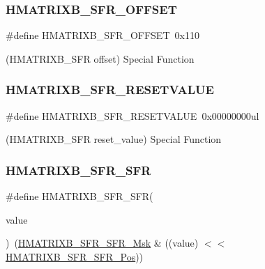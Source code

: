 \subsubsection{\texorpdfstring{HMATRIXB\_SFR\_OFFSET}{HMATRIXB\_SFR\_OFFSET}}
{\footnotesize\ttfamily \#define H\+M\+A\+T\+R\+I\+X\+B\+\_\+\+S\+F\+R\+\_\+\+O\+F\+F\+S\+ET~0x110}



(H\+M\+A\+T\+R\+I\+X\+B\+\_\+\+S\+FR offset) Special Function 

\mbox{\label{group___s_a_m_d21___h_m_a_t_r_i_x_b_ga95ba9b5ac1ee7150547d552e80d562cd}} 
\subsubsection{\texorpdfstring{HMATRIXB\_SFR\_RESETVALUE}{HMATRIXB\_SFR\_RESETVALUE}}
{\footnotesize\ttfamily \#define H\+M\+A\+T\+R\+I\+X\+B\+\_\+\+S\+F\+R\+\_\+\+R\+E\+S\+E\+T\+V\+A\+L\+UE~0x00000000ul}



(H\+M\+A\+T\+R\+I\+X\+B\+\_\+\+S\+FR reset\+\_\+value) Special Function 

\mbox{\label{group___s_a_m_d21___h_m_a_t_r_i_x_b_gad5546ade174352c506f43daa70d6f66c}} 
\subsubsection{\texorpdfstring{HMATRIXB\_SFR\_SFR}{HMATRIXB\_SFR\_SFR}}
{\footnotesize\ttfamily \#define H\+M\+A\+T\+R\+I\+X\+B\+\_\+\+S\+F\+R\+\_\+\+S\+FR(\begin{DoxyParamCaption}\item[{}]{value }\end{DoxyParamCaption})~(\mbox{\hyperlink{group___s_a_m_d21___h_m_a_t_r_i_x_b_ga9db3c5b8bf5c84b7fe3f7805d528287d}{H\+M\+A\+T\+R\+I\+X\+B\+\_\+\+S\+F\+R\+\_\+\+S\+F\+R\+\_\+\+Msk}} \& ((value) $<$$<$ \mbox{\hyperlink{group___s_a_m_d21___h_m_a_t_r_i_x_b_ga0cea7beda28a2ce9ed68288054ed78e2}{H\+M\+A\+T\+R\+I\+X\+B\+\_\+\+S\+F\+R\+\_\+\+S\+F\+R\+\_\+\+Pos}}))}

